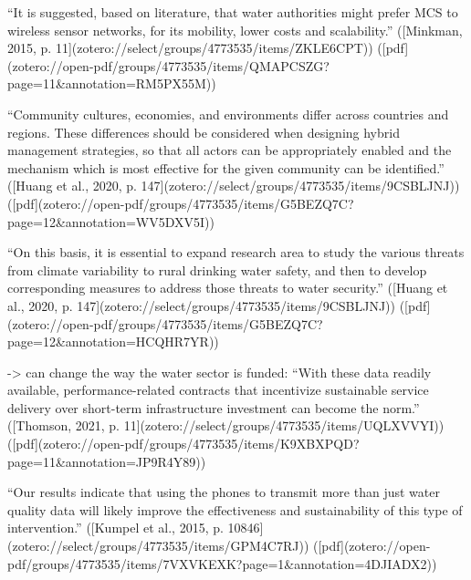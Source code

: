 “It is suggested, based on literature, that water authorities might prefer MCS to wireless sensor networks, for its mobility, lower costs and scalability.” ([Minkman, 2015, p. 11](zotero://select/groups/4773535/items/ZKLE6CPT)) ([pdf](zotero://open-pdf/groups/4773535/items/QMAPCSZG?page=11&annotation=RM5PX55M))

“Community cultures, economies, and environments differ across countries and regions. These differences should be considered when designing hybrid management strategies, so that all actors can be appropriately enabled and the mechanism which is most effective for the given community can be identified.” ([Huang et al., 2020, p. 147](zotero://select/groups/4773535/items/9CSBLJNJ)) ([pdf](zotero://open-pdf/groups/4773535/items/G5BEZQ7C?page=12&annotation=WV5DXV5I))

“On this basis, it is essential to expand research area to study the various threats from climate variability to rural drinking water safety, and then to develop corresponding measures to address those threats to water security.” ([Huang et al., 2020, p. 147](zotero://select/groups/4773535/items/9CSBLJNJ)) ([pdf](zotero://open-pdf/groups/4773535/items/G5BEZQ7C?page=12&annotation=HCQHR7YR))

-> can change the way the water sector is funded: “With these data readily available, performance-related contracts that incentivize sustainable service delivery over short-term infrastructure investment can become the norm.” ([Thomson, 2021, p. 11](zotero://select/groups/4773535/items/UQLXVVYI)) ([pdf](zotero://open-pdf/groups/4773535/items/K9XBXPQD?page=11&annotation=JP9R4Y89))


“Our results indicate that using the phones to transmit more than just water quality data will likely improve the effectiveness and sustainability of this type of intervention.” ([Kumpel et al., 2015, p. 10846](zotero://select/groups/4773535/items/GPM4C7RJ)) ([pdf](zotero://open-pdf/groups/4773535/items/7VXVKEXK?page=1&annotation=4DJIADX2))




